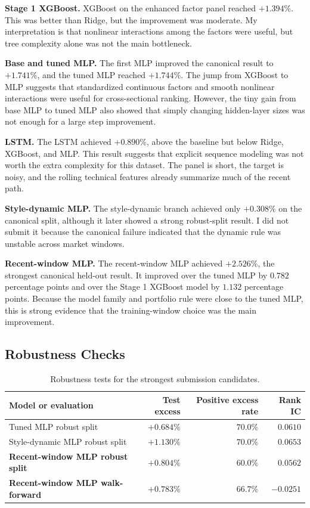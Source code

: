 \documentclass[11pt]{article}
\begin{document}
\textbf{Stage 1 XGBoost.}
XGBoost on the enhanced factor panel reached \(+1.394\%\). This was better than
Ridge, but the improvement was moderate. My interpretation is that nonlinear
interactions among the factors were useful, but tree complexity alone was not
the main bottleneck.

\textbf{Base and tuned MLP.}
The first MLP improved the canonical result to \(+1.741\%\), and the tuned MLP
reached \(+1.744\%\). The jump from XGBoost to MLP suggests that standardized
continuous factors and smooth nonlinear interactions were useful for
cross-sectional ranking. However, the tiny gain from base MLP to tuned MLP
also showed that simply changing hidden-layer sizes was not enough for a large
step improvement.

\textbf{LSTM.}
The LSTM achieved \(+0.890\%\), above the baseline but below Ridge, XGBoost,
and MLP. This result suggests that explicit sequence modeling was not worth
the extra complexity for this dataset. The panel is short, the target is noisy,
and the rolling technical features already summarize much of the recent path.

\textbf{Style-dynamic MLP.}
The style-dynamic branch achieved only \(+0.308\%\) on the canonical split,
although it later showed a strong robust-split result. I did not submit it
because the canonical failure indicated that the dynamic rule was unstable
across market windows.

\textbf{Recent-window MLP.}
The recent-window MLP achieved \(+2.526\%\), the strongest canonical held-out
result. It improved over the tuned MLP by \(0.782\) percentage points and over
the Stage 1 XGBoost model by \(1.132\) percentage points. Because the model
family and portfolio rule were close to the tuned MLP, this is strong evidence
that the training-window choice was the main improvement.

\subsection{Robustness Checks}

\begin{table}[h]
\centering
\caption{Robustness tests for the strongest submission candidates.}
\begin{tabular}{lrrr}
\toprule
Model or evaluation & Test excess & Positive excess rate & Rank IC \\
\midrule
Tuned MLP robust split & \(+0.684\%\) & \(70.0\%\) & \(0.0610\) \\
Style-dynamic MLP robust split & \(+1.130\%\) & \(70.0\%\) & \(0.0653\) \\
\textbf{Recent-window MLP robust split} & \(\mathbf{+0.804\%}\) & \(60.0\%\) & \(0.0562\) \\
\textbf{Recent-window MLP walk-forward} & \(\mathbf{+0.783\%}\) & \(66.7\%\) & \(-0.0251\) \\
\bottomrule
\end{tabular}
\end{table}
\end{document}
